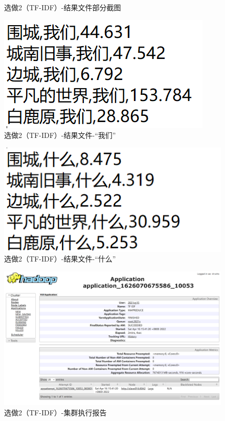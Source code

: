 \documentclass[a4paper,UTF8]{article}
\theoremstyle{definition}
\begin{document}
\begin{CJK}{UTF8}{gkai}
\begin{enumerate}
\begin{figure}[H]
	    \caption{选做2（TF-IDF）-结果文件部分截图}
	\end{figure} 
	\begin{figure}[H]
	    \centering
	    \includegraphics[scale=0.4]{./img/TFIDF_we.png}
	    \caption{选做2（TF-IDF）-结果文件-“我们”}
	\end{figure} 
	\begin{figure}[H]
	    \centering
	    \includegraphics[scale=0.4]{./img/TFIDF_what.png}
	    \caption{选做2（TF-IDF）-结果文件-“什么”}
	\end{figure} 
	\begin{figure}[H]
	    \centering
	    \includegraphics[scale=0.4]{./img/TFIDF.png}
	    \caption{选做2（TF-IDF）-集群执行报告}
	\end{figure} 
\end{enumerate}


\end{CJK}
\end{document}

